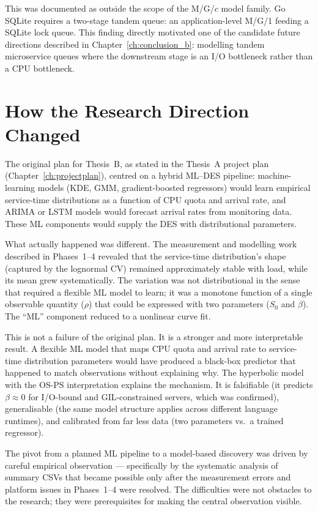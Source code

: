 This was documented as outside the scope of the M/G/$c$ model family. Go SQLite requires a two-stage tandem queue: an application-level M/G/1 feeding a SQLite lock queue. This finding directly motivated one of the candidate future directions described in Chapter~\ref{ch:conclusion_b}: modelling tandem microservice queues where the downstream stage is an I/O bottleneck rather than a CPU bottleneck.

\section{How the Research Direction Changed}
\label{sec:journey-pivot}

The original plan for Thesis~B, as stated in the Thesis~A project plan (Chapter~\ref{ch:projectplan}), centred on a hybrid ML--DES pipeline: machine-learning models (KDE, GMM, gradient-boosted regressors) would learn empirical service-time distributions as a function of CPU quota and arrival rate, and ARIMA or LSTM models would forecast arrival rates from monitoring data. These ML components would supply the DES with distributional parameters.

What actually happened was different. The measurement and modelling work described in Phases~1--4 revealed that the service-time distribution's shape (captured by the lognormal CV) remained approximately stable with load, while its mean grew systematically. The variation was not distributional in the sense that required a flexible ML model to learn; it was a monotone function of a single observable quantity ($\rho$) that could be expressed with two parameters ($S_0$ and $\beta$). The ``ML'' component reduced to a nonlinear curve fit.

This is not a failure of the original plan. It is a stronger and more interpretable result. A flexible ML model that maps CPU quota and arrival rate to service-time distribution parameters would have produced a black-box predictor that happened to match observations without explaining why. The hyperbolic model with the OS-PS interpretation explains the mechanism. It is falsifiable (it predicts $\beta \approx 0$ for I/O-bound and GIL-constrained servers, which was confirmed), generalisable (the same model structure applies across different language runtimes), and calibrated from far less data (two parameters vs.\ a trained regressor).

The pivot from a planned ML pipeline to a model-based discovery was driven by careful empirical observation — specifically by the systematic analysis of summary CSVs that became possible only after the measurement errors and platform issues in Phases~1--4 were resolved. The difficulties were not obstacles to the research; they were prerequisites for making the central observation visible.
